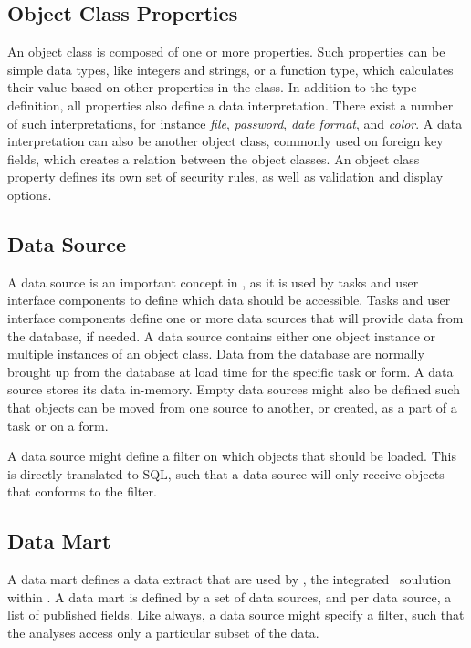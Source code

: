 \subsection{Object Class Properties}
\label{sub:Object Class Properties}
An object class is composed of one or more properties. Such properties can be simple data types, like integers and strings, or a function type, which calculates their value based on other properties in the class. In addition to the type definition, all properties also define a data interpretation. There exist a number of such interpretations, for instance \textit{file}, \textit{password}, \textit{date format}, and \textit{color}. A data interpretation can also be another object class, commonly used on foreign key fields, which creates a relation between the object classes. An object class property defines its own set of security rules, as well as validation and display options.

\subsection{Data Source}
\label{sub:Data Source}
A data source is an important concept in \gap, as it is used by tasks and user interface components to define which data should be accessible. Tasks and user interface components define one or more data sources that will provide data from the database, if needed. A data source contains either one object instance or multiple instances of an object class. Data from the database are normally brought up from the database at load time for the specific task or form. A data source stores its data in-memory. Empty data sources might also be defined such that objects can be moved from one source to another, or created, as a part of a task or on a form.

A data source might define a filter on which objects that should be loaded. This is directly translated to SQL, such that a data source will only receive objects that conforms to the filter.

\subsection{Data Mart}
\label{sub:Data Mart}
A data mart defines a data extract that are used by , the integrated \bd~soulution within \gap. A data mart is defined by a set of data sources, and per data source, a list of published fields. Like always, a data source might specify a filter, such that the analyses access only a particular subset of the data.

